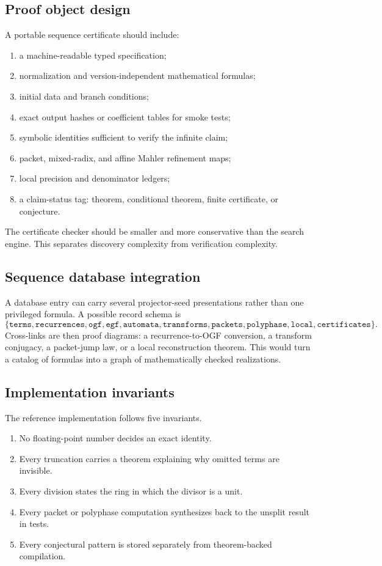 \documentclass[11pt]{article}
\theoremstyle{definition}\newtheorem{definition}[theorem]{Definition}\newtheorem{example}[theorem]{Example}\newtheorem{construction}[theorem]{Construction}\newtheorem{algorithm}[theorem]{Algorithm}\newtheorem{conjecture}[theorem]{Conjecture}\newtheorem{problem}[theorem]{Problem}
\theoremstyle{remark}\newtheorem{remark}[theorem]{Remark}\newtheorem{boundary}[theorem]{Boundary}\newtheorem{certificate}[theorem]{Computational Certificate}\newtheorem{classical}[theorem]{Classical Input}\newtheorem{principle}[theorem]{Structural Principle}
\begin{document}
\subsection{Proof object design}
A portable sequence certificate should include:
\begin{enumerate}
\item a machine-readable typed specification;
\item normalization and version-independent mathematical formulas;
\item initial data and branch conditions;
\item exact output hashes or coefficient tables for smoke tests;
\item symbolic identities sufficient to verify the infinite claim;
\item packet, mixed-radix, and affine Mahler refinement maps;
\item local precision and denominator ledgers;
\item a claim-status tag: theorem, conditional theorem, finite certificate, or conjecture.
\end{enumerate}

The certificate checker should be smaller and more conservative than the search engine.  This separates discovery complexity from verification complexity.

\subsection{Sequence database integration}
A database entry can carry several projector-seed presentations rather than one privileged formula.  A possible record schema is
\[
 \{
 \texttt{terms},\texttt{recurrences},\texttt{ogf},\texttt{egf},\texttt{automata},
 \texttt{transforms},\texttt{packets},\texttt{polyphase},\texttt{local},\texttt{certificates}
 \}.
\]
Cross-links are then proof diagrams: a recurrence-to-OGF conversion, a transform conjugacy, a packet-jump law, or a local reconstruction theorem.  This would turn a catalog of formulas into a graph of mathematically checked realizations.

\subsection{Implementation invariants}
The reference implementation follows five invariants.
\begin{enumerate}
\item No floating-point number decides an exact identity.
\item Every truncation carries a theorem explaining why omitted terms are invisible.
\item Every division states the ring in which the divisor is a unit.
\item Every packet or polyphase computation synthesizes back to the unsplit result in tests.
\item Every conjectural pattern is stored separately from theorem-backed compilation.
\end{enumerate}
\end{document}
